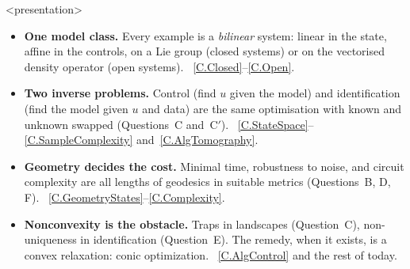 \documentclass[handoutsbeamer.tex]{subfiles}
\begin{document}
\begin{frame}
\onp{\begin{center}\resizebox{0.88\linewidth}{!}{}\end{center}}
\end{frame}

\begin{frame}<presentation>
\end{frame}

\begin{frame}
\begin{itemize}\setlength\itemsep{0.4em}
    \item \textbf{One model class.} Every example is a \emph{bilinear} system: linear in the state, affine in the controls, on a Lie group (closed systems) or on the vectorised density operator (open systems). \Chaps~\ref{C.Closed}--\ref{C.Open}.
    \item \textbf{Two inverse problems.} Control (find $u$ given the model) and identification (find the model given $u$ and data) are the same optimisation with known and unknown swapped (Questions~C and~C$'$). \Chaps~\ref{C.StateSpace}--\ref{C.SampleComplexity} and~\ref{C.AlgTomography}.
    \item \textbf{Geometry decides the cost.} Minimal time, robustness to noise, and circuit complexity are all lengths of geodesics in suitable metrics (Questions~B, D, F). \Chaps~\ref{C.GeometryStates}--\ref{C.Complexity}.
    \item \textbf{Nonconvexity is the obstacle.} Traps in landscapes (Question~C), non-uniqueness in identification (Question~E). The remedy, when it exists, is a convex relaxation: \alert{conic optimization}. \Chap~\ref{C.AlgControl} and the rest of today.
\end{itemize}
\end{frame}
\end{document}
